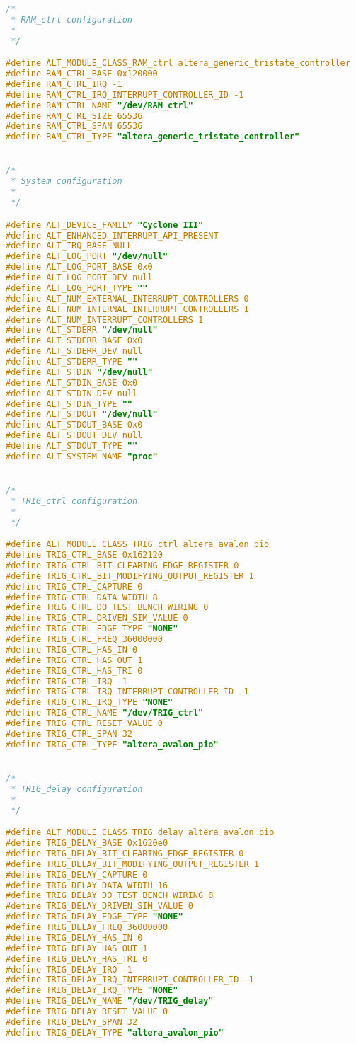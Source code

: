 \begin{lstlisting}[language=C]
/*
 * RAM_ctrl configuration
 *
 */

#define ALT_MODULE_CLASS_RAM_ctrl altera_generic_tristate_controller
#define RAM_CTRL_BASE 0x120000
#define RAM_CTRL_IRQ -1
#define RAM_CTRL_IRQ_INTERRUPT_CONTROLLER_ID -1
#define RAM_CTRL_NAME "/dev/RAM_ctrl"
#define RAM_CTRL_SIZE 65536
#define RAM_CTRL_SPAN 65536
#define RAM_CTRL_TYPE "altera_generic_tristate_controller"


/*
 * System configuration
 *
 */

#define ALT_DEVICE_FAMILY "Cyclone III"
#define ALT_ENHANCED_INTERRUPT_API_PRESENT
#define ALT_IRQ_BASE NULL
#define ALT_LOG_PORT "/dev/null"
#define ALT_LOG_PORT_BASE 0x0
#define ALT_LOG_PORT_DEV null
#define ALT_LOG_PORT_TYPE ""
#define ALT_NUM_EXTERNAL_INTERRUPT_CONTROLLERS 0
#define ALT_NUM_INTERNAL_INTERRUPT_CONTROLLERS 1
#define ALT_NUM_INTERRUPT_CONTROLLERS 1
#define ALT_STDERR "/dev/null"
#define ALT_STDERR_BASE 0x0
#define ALT_STDERR_DEV null
#define ALT_STDERR_TYPE ""
#define ALT_STDIN "/dev/null"
#define ALT_STDIN_BASE 0x0
#define ALT_STDIN_DEV null
#define ALT_STDIN_TYPE ""
#define ALT_STDOUT "/dev/null"
#define ALT_STDOUT_BASE 0x0
#define ALT_STDOUT_DEV null
#define ALT_STDOUT_TYPE ""
#define ALT_SYSTEM_NAME "proc"


/*
 * TRIG_ctrl configuration
 *
 */

#define ALT_MODULE_CLASS_TRIG_ctrl altera_avalon_pio
#define TRIG_CTRL_BASE 0x162120
#define TRIG_CTRL_BIT_CLEARING_EDGE_REGISTER 0
#define TRIG_CTRL_BIT_MODIFYING_OUTPUT_REGISTER 1
#define TRIG_CTRL_CAPTURE 0
#define TRIG_CTRL_DATA_WIDTH 8
#define TRIG_CTRL_DO_TEST_BENCH_WIRING 0
#define TRIG_CTRL_DRIVEN_SIM_VALUE 0
#define TRIG_CTRL_EDGE_TYPE "NONE"
#define TRIG_CTRL_FREQ 36000000
#define TRIG_CTRL_HAS_IN 0
#define TRIG_CTRL_HAS_OUT 1
#define TRIG_CTRL_HAS_TRI 0
#define TRIG_CTRL_IRQ -1
#define TRIG_CTRL_IRQ_INTERRUPT_CONTROLLER_ID -1
#define TRIG_CTRL_IRQ_TYPE "NONE"
#define TRIG_CTRL_NAME "/dev/TRIG_ctrl"
#define TRIG_CTRL_RESET_VALUE 0
#define TRIG_CTRL_SPAN 32
#define TRIG_CTRL_TYPE "altera_avalon_pio"


/*
 * TRIG_delay configuration
 *
 */

#define ALT_MODULE_CLASS_TRIG_delay altera_avalon_pio
#define TRIG_DELAY_BASE 0x1620e0
#define TRIG_DELAY_BIT_CLEARING_EDGE_REGISTER 0
#define TRIG_DELAY_BIT_MODIFYING_OUTPUT_REGISTER 1
#define TRIG_DELAY_CAPTURE 0
#define TRIG_DELAY_DATA_WIDTH 16
#define TRIG_DELAY_DO_TEST_BENCH_WIRING 0
#define TRIG_DELAY_DRIVEN_SIM_VALUE 0
#define TRIG_DELAY_EDGE_TYPE "NONE"
#define TRIG_DELAY_FREQ 36000000
#define TRIG_DELAY_HAS_IN 0
#define TRIG_DELAY_HAS_OUT 1
#define TRIG_DELAY_HAS_TRI 0
#define TRIG_DELAY_IRQ -1
#define TRIG_DELAY_IRQ_INTERRUPT_CONTROLLER_ID -1
#define TRIG_DELAY_IRQ_TYPE "NONE"
#define TRIG_DELAY_NAME "/dev/TRIG_delay"
#define TRIG_DELAY_RESET_VALUE 0
#define TRIG_DELAY_SPAN 32
#define TRIG_DELAY_TYPE "altera_avalon_pio"



\end{lstlisting}

